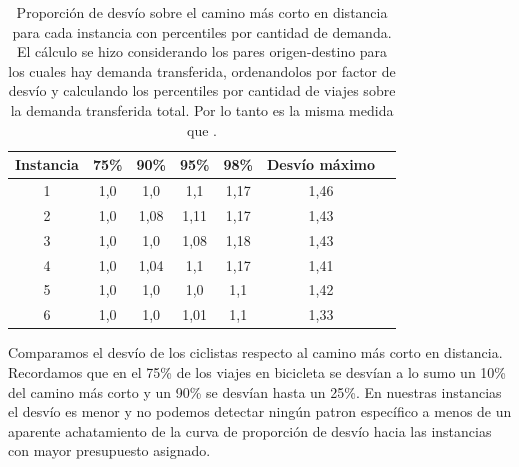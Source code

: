 \begin{table}[h!]
  \centering
  \begin{tabular}{ccccccc}
    \toprule
      Instancia & 75\% & 90\% & 95\% & 98\% & Desvío máximo \\
    \midrule
      1 & 1,0 & 1,0 & 1,1 & 1,17 & 1,46 \\
      2 & 1,0 & 1,08 & 1,11 & 1,17 & 1,43 \\
      3 & 1,0 & 1,0 & 1,08 & 1,18 & 1,43 \\
      4 & 1,0 & 1,04 & 1,1 & 1,17 & 1,41 \\
      5 & 1,0 & 1,0 & 1,0 & 1,1 & 1,42 \\
      6 & 1,0 & 1,0 & 1,01 & 1,1 & 1,33 \\
    \bottomrule
  \end{tabular}
  \caption{Proporción de desvío sobre el camino más corto en distancia para cada instancia con percentiles por cantidad de demanda. El cálculo se hizo considerando los pares origen-destino para los cuales hay demanda transferida, ordenandolos por factor de desvío y calculando los percentiles por cantidad de viajes sobre la demanda transferida total. Por lo tanto es la misma medida que \cite{winters2010}.}
  \label{table:montevideoshortestpathdeviation}
\end{table}

Comparamos el desvío de los ciclistas respecto al camino más corto en distancia. Recordamos que en \cite{winters2010} el 75\% de los viajes en bicicleta se desvían a lo sumo un 10\% del camino más corto y un 90\% se desvían hasta un 25\%. En nuestras instancias el desvío es menor y no podemos detectar ningún patron específico a menos de un aparente achatamiento de la curva de proporción de desvío hacia las instancias con mayor presupuesto asignado.

